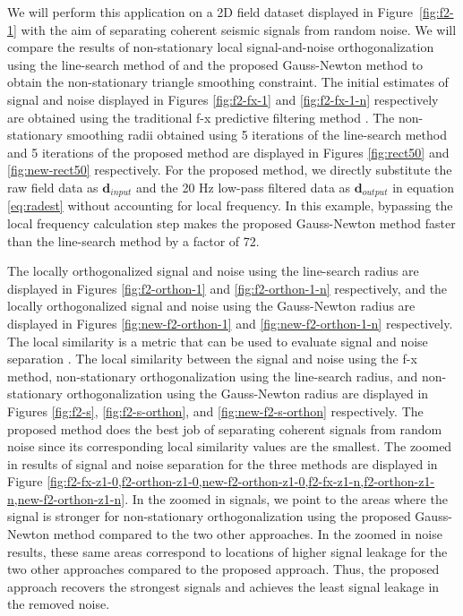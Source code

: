 We will perform this application on a 2D field dataset displayed in Figure~\ref{fig:f2-1} with the aim of separating coherent seismic signals from random noise. We will compare the results of non-stationary local signal-and-noise orthogonalization using the line-search method of \cite{greerfomel2018} and the proposed Gauss-Newton method to obtain the non-stationary triangle smoothing constraint. The initial estimates of signal and noise displayed in Figures \ref{fig:f2-fx-1} and \ref{fig:f2-fx-1-n} respectively are obtained using the traditional f-x predictive filtering method \cite[]{canales1984}. The non-stationary smoothing radii obtained using 5 iterations of the line-search method and 5 iterations of the proposed method are displayed in Figures \ref{fig:rect50} and \ref{fig:new-rect50} respectively. For the proposed method, we directly substitute the raw field data as $\mathbf{d}_{input}$ and the 20 Hz low-pass filtered data as $\mathbf{d}_{output}$ in equation \ref{eq:radest} without accounting for local frequency. In this example, bypassing the local frequency calculation step makes the proposed Gauss-Newton method faster than the line-search method by a factor of 72.

The locally orthogonalized signal and noise using the line-search radius are displayed in Figures \ref{fig:f2-orthon-1} and \ref{fig:f2-orthon-1-n} respectively, and the locally orthogonalized signal and noise using the Gauss-Newton radius are displayed in Figures \ref{fig:new-f2-orthon-1} and \ref{fig:new-f2-orthon-1-n} respectively. 
The local similarity is a metric that can be used to evaluate signal and noise separation \cite[]{chenfomel2015}.
The local similarity between the signal and noise using the f-x method, non-stationary orthogonalization using the line-search radius, and non-stationary orthogonalization using the Gauss-Newton radius are displayed in Figures \ref{fig:f2-s}, \ref{fig:f2-s-orthon}, and \ref{fig:new-f2-s-orthon} respectively. 
The proposed method does the best job of separating coherent signals from random noise since its corresponding local similarity values are the smallest. 
The zoomed in results of signal and noise separation for the three methods are displayed in Figure \ref{fig:f2-fx-z1-0,f2-orthon-z1-0,new-f2-orthon-z1-0,f2-fx-z1-n,f2-orthon-z1-n,new-f2-orthon-z1-n}.
In the zoomed in signals, we point to the areas where the signal is stronger for non-stationary orthogonalization using the proposed Gauss-Newton method compared to the two other approaches. 
In the zoomed in noise results, these same areas correspond to locations of higher signal leakage for the two other approaches compared to the proposed approach. 
Thus, the proposed approach recovers the strongest signals and achieves the least signal leakage in the removed noise. 



